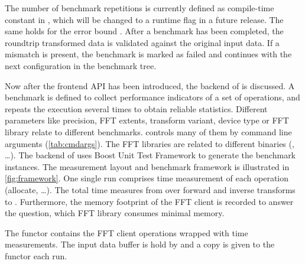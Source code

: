 The number of benchmark repetitions is currently defined as compile-time constant in , which will be changed to a runtime flag in a future release.
The same holds for the error bound . After a benchmark has been completed, the roundtrip transformed data is validated against the original input data. If a mismatch is present, the benchmark is marked as failed and \gearshifft{} continues with the next configuration in the benchmark tree.

Now after the frontend API has been introduced, the backend of \gearshifft{} is discussed.
A benchmark is defined to collect performance indicators of a set of operations, and repeats the execution several times to obtain reliable statistics. Different parameters like precision, FFT extents, transform variant, device type or FFT library relate to different benchmarks.
\gearshifft{} controls many of them by command line arguments (\cref{tab:cmdargs}). The FFT libraries are related to different \gearshifft{} binaries (, \ldots).
The backend of \gearshifft{} uses Boost Unit Test Framework to generate the benchmark instances. %
%
The measurement layout and benchmark framework is illustrated in \cref{fig:framework}.
One single run comprises time measurement of each operation (allocate, \ldots). 
The total time measures from  over forward and inverse transforms to .
Furthermore, the memory footprint of the FFT client is recorded to answer the question, which FFT library consumes minimal memory.

The functor  contains the FFT client operations wrapped with time measurements. The input data buffer is hold by  and a copy is given to the  functor each run.

